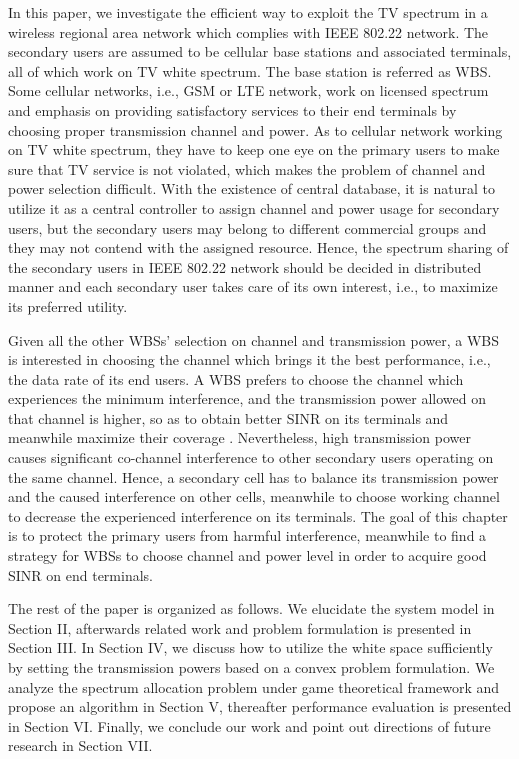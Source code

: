 \documentclass[times]{ettauth}
\newcommand{\ie}{i.e., }
\theoremstyle{mytheoremstyle}
\theoremstyle{mytheoremstyle}
\theoremstyle{mytheoremstyle}
\begin{document}
In this paper, we investigate the efficient way to exploit the TV spectrum in a wireless regional area network which complies with IEEE 802.22 network.
The secondary users are assumed to be cellular base stations and associated terminals, all of which work on TV white spectrum. 
The base station is referred as WBS.
Some cellular networks, \ie GSM or LTE network, work on licensed spectrum and emphasis on providing satisfactory services to their end terminals by choosing proper transmission channel and power. 
As to cellular network working on TV white spectrum, they have to keep one eye on the primary users to make sure that TV service is not violated, which makes the problem of channel and power selection difficult.
With the existence of central database, it is natural to utilize it as a central controller to assign channel and power usage for secondary users, but the secondary users may belong to different commercial groups and they may not contend with the assigned resource.
Hence, the spectrum sharing of the secondary users in IEEE 802.22 network should be decided in distributed manner and each secondary user takes care of its own interest, \ie to maximize its preferred utility.

Given all the other WBSs' selection on channel and transmission power, a WBS is interested in choosing the channel which brings it the best performance, \ie the data rate of its end users.
A WBS prefers to choose the channel which experiences the minimum interference, and the transmission power allowed on that channel is higher, so as to obtain better SINR on its terminals and meanwhile maximize their coverage \cite{wuinfocom09, HoangPowerChannel2010}. 
Nevertheless, high transmission power causes significant co-channel interference to other secondary users operating on the same channel. 
Hence, a secondary cell has to balance its transmission power and the caused interference on other cells, meanwhile to choose working channel to decrease the experienced interference on its terminals. 
The goal of this chapter is to protect the primary users from harmful interference, meanwhile to find a strategy for WBSs to choose channel and power level in order to acquire good SINR on end terminals.

The rest of the paper is organized as follows. 
We elucidate the system model in Section II, afterwards related work and problem formulation is presented in Section III. In Section IV, we discuss how to utilize the white space sufficiently by setting the transmission powers based on a convex problem formulation. We analyze the spectrum allocation problem under game theoretical framework and propose an algorithm in Section V, thereafter performance evaluation is presented in Section VI. Finally, we conclude our work and point out directions of future research in Section VII.
\end{document}
